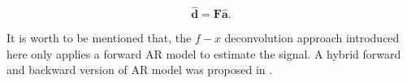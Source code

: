 \begin{equation}
\label{eq:solution1}
\hat{\mathbf{d}}= \mathbf{F}\hat{\mathbf{a}}.
\end{equation}

It is worth to be mentioned that, the $f-x$ deconvolution approach introduced here only applies a forward AR model to estimate the signal. A hybrid forward and backward version of AR model was proposed in \cite{yanghua1999}.













